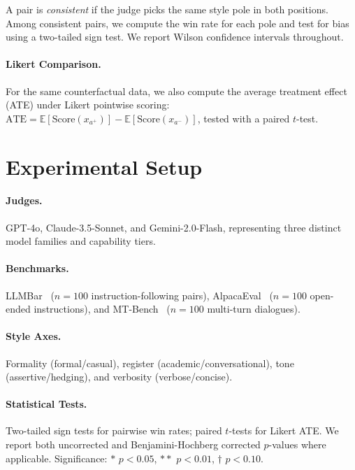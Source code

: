 \documentclass[11pt,a4paper]{article}
\begin{document}
A pair is \emph{consistent} if the judge picks the same style pole in both positions.
Among consistent pairs, we compute the win rate for each pole and test for bias using a two-tailed sign test.
We report Wilson confidence intervals throughout.

\paragraph{Likert Comparison.}
For the same counterfactual data, we also compute the average treatment effect (ATE) under Likert pointwise scoring: $\text{ATE} = \mathbb{E}[\text{Score}(x_{a^+})] - \mathbb{E}[\text{Score}(x_{a^-})]$, tested with a paired $t$-test.

\section{Experimental Setup}
\label{sec:setup}

\paragraph{Judges.} GPT-4o, Claude-3.5-Sonnet, and Gemini-2.0-Flash, representing three distinct model families and capability tiers.

\paragraph{Benchmarks.} LLMBar~\cite{zeng2024llmbar} ($n{=}100$ instruction-following pairs), AlpacaEval~\cite{dubois2024length} ($n{=}100$ open-ended instructions), and MT-Bench~\cite{zheng2024judging} ($n{=}100$ multi-turn dialogues).

\paragraph{Style Axes.} Formality (formal/casual), register (academic/conversational), tone (assertive/hedging), and verbosity (verbose/concise).

\paragraph{Statistical Tests.} Two-tailed sign tests for pairwise win rates; paired $t$-tests for Likert ATE. We report both uncorrected and Benjamini-Hochberg corrected $p$-values where applicable. Significance: $*$ $p{<}0.05$, $**$ $p{<}0.01$, $\dagger$ $p{<}0.10$.
\end{document}
